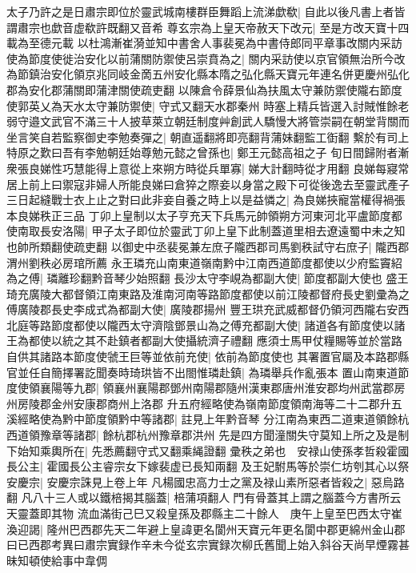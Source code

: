 太子乃許之是日肅宗即位於靈武城南樓群臣舞蹈上流涕歔欷|{
	自此以後凡書上者皆謂肅宗也歔音虚欷許既翻又音希}
尊玄宗為上皇天帝赦天下改元|{
	至是方改天寶十四載為至德元載}
以杜鴻漸崔漪並知中書舍人事裴冕為中書侍郎同平章事改關内采訪使為節度使徙治安化以前蒲關防禦使呂崇賁為之|{
	關内采訪使以京官領無治所今改為節鎮治安化領京兆同岐金啇五州安化縣本隋之弘化縣天寶元年連名併更慶州弘化郡為安化郡蒲關即蒲津關使疏吏翻}
以陳倉令薛景仙為扶風太守兼防禦使隴右節度使郭英乂為天水太守兼防禦使|{
	守式又翻天水郡秦州}
時塞上精兵皆選入討賊惟餘老弱守邉文武官不滿三十人披草萊立朝廷制度艸創武人驕慢大將管崇嗣在朝堂背關而坐言笑自若監察御史李勉奏彈之|{
	朝直遥翻將即亮翻背蒲妹翻監工衘翻}
繫於有司上特原之歎曰吾有李勉朝廷始尊勉元懿之曾孫也|{
	鄭王元懿高祖之子}
旬日間歸附者漸衆張良娣性巧慧能得上意從上來朔方時從兵單寡|{
	娣大計翻時從才用翻}
良娣每寢常居上前上曰禦寇非婦人所能良娣曰倉猝之際妾以身當之殿下可從後逸去至靈武產子三日起縫戰士衣上止之對曰此非妾自養之時上以是益憐之|{
	為良娣挾寵當權得禍張本良娣秩正三品}
丁卯上皇制以太子亨充天下兵馬元帥領朔方河東河北平盧節度都使南取長安洛陽|{
	甲子太子即位於靈武丁卯上皇下此制蓋道里相去遼遠蜀中未之知也帥所類翻使疏吏翻}
以御史中丞裴冕兼左庶子隴西郡司馬劉秩試守右庶子|{
	隴西郡渭州劉秩必房琯所薦}
永王璘充山南東道嶺南黔中江南西道節度都使以少府監竇紹為之傅|{
	璘離珍翻黔音琴少始照翻}
長沙太守李峴為都副大使|{
	節度都副大使也}
盛王琦充廣陵大都督領江南東路及淮南河南等路節度都使以前江陵都督府長史劉彚為之傅廣陵郡長史李成式為都副大使|{
	廣陵郡揚州}
豐王珙充武威都督仍領河西隴右安西北庭等路節度都使以隴西太守濟陰鄧景山為之傅充都副大使|{
	諸道各有節度使以諸王為都使以統之其不赴鎮者都副大使攝統濟子禮翻}
應須士馬甲仗糧賜等並於當路自供其諸路本節度使虢王巨等並依前充使|{
	依前為節度使也}
其署置官屬及本路郡縣官並任自簡擇署訖聞奏時琦珙皆不出閤惟璘赴鎮|{
	為璘舉兵作亂張本}
置山南東道節度使領襄陽等九郡|{
	領襄州襄陽郡鄧州南陽郡隨州漢東郡唐州淮安郡均州武當郡房州房陵郡金州安康郡商州上洛郡}
升五府經略使為嶺南節度領南海等二十二郡升五溪經略使為黔中節度領黔中等諸郡|{
	註見上年黔音琴}
分江南為東西二道東道領餘杭西道領豫章等諸郡|{
	餘杭郡杭州豫章郡洪州}
先是四方聞潼關失守莫知上所之及是制下始知乘輿所在|{
	先悉薦翻守式又翻乘䋲證翻}
彚秩之弟也　安禄山使孫孝哲殺霍國長公主|{
	霍國長公主睿宗女下嫁裴虚已長知兩翻}
及王妃駙馬等於崇仁坊刳其心以祭安慶宗|{
	安慶宗誅見上卷上年}
凡楊國忠高力士之黨及禄山素所惡者皆殺之|{
	惡烏路翻}
凡八十三人或以鐵棓揭其腦蓋|{
	棓蒲項翻人門有骨蓋其上謂之腦蓋今方書所云天靈蓋即其物}
流血滿街己巳又殺皇孫及郡縣主二十餘人　庚午上皇至巴西太守崔渙迎謁|{
	隆州巴西郡先天二年避上皇諱更名閬州天寶元年更名閬中郡更綿州金山郡曰已西郡考異曰肅宗實録作辛未今從玄宗實録次柳氏舊聞上始入斜谷天尚早煙霧甚昧知頓使給事中韋倜}


